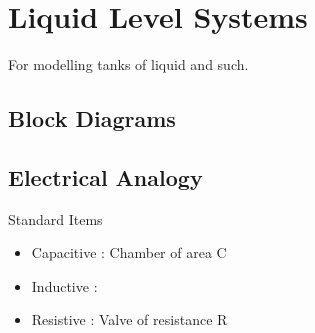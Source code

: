 \documentclass{../templates/topic}
\begin{document}
\chapter{Liquid Level Systems}

For modelling tanks of liquid and such.

\section{Block Diagrams}



\section{Electrical Analogy}
Standard Items
\begin{itemize}
	\item Capacitive : Chamber of area C
	\item Inductive :
	\item Resistive : Valve of resistance R
\end{itemize}
\end{document}
